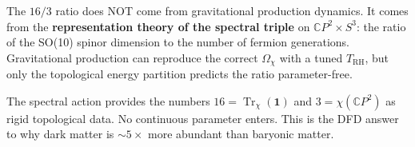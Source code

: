 \documentclass[11pt]{article}
\theoremstyle{definition}
\theoremstyle{remark}
\newcommand{\CP}{\mathbb{C}P}
\newcommand{\Tr}{\operatorname{Tr}}
\begin{document}
\begin{tcolorbox}[colback=red!5!white, colframe=red!70!black,
  title=\textbf{Bottom Line}]
The $16/3$ ratio does NOT come from gravitational production dynamics.
It comes from the \textbf{representation theory of the spectral triple}
on $\CP^2 \times S^3$: the ratio of the SO(10) spinor dimension to the
number of fermion generations. Gravitational production can reproduce the
correct $\Omega_\chi$ with a tuned $T_\mathrm{RH}$, but only the
topological energy partition predicts the ratio parameter-free.

The spectral action provides the numbers $16 = \Tr_\chi(\mathbf{1})$ and
$3 = \chi(\CP^2)$ as rigid topological data. No continuous parameter
enters. This is the DFD answer to why dark matter is $\sim 5\times$
more abundant than baryonic matter.
\end{tcolorbox}
\end{document}
